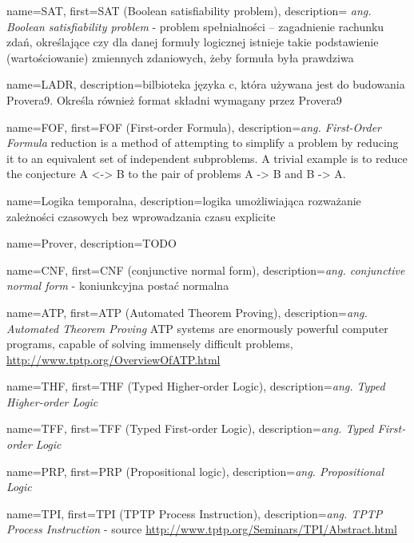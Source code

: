 
 {
    name=SAT,
    first={SAT (Boolean satisfiability problem)},
    description={ \textit{ang. Boolean satisfiability problem} - problem spełnialności – zagadnienie rachunku zdań, określające czy dla danej formuły logicznej istnieje takie podstawienie (wartościowanie) zmiennych zdaniowych, żeby formuła była prawdziwa}
}

 {
    name=LADR,
    description={bilbioteka języka c, która używana jest do budowania Provera9. Określa również format składni wymagany przez Provera9}
}

 {
    name=FOF,
    first={FOF (First-order Formula)},
    description={\textit{ang. First-Order Formula} reduction is a method of attempting to simplify a problem by reducing it to an equivalent set of independent subproblems. A trivial example is to reduce the conjecture A <-> B to the pair of problems A -> B and B -> A.}
}

 {
    name={Logika temporalna},
    description={logika umożliwiająca rozważanie zależności czasowych bez wprowadzania czasu explicite}
}

 {
    name=Prover,
    description={TODO}
}

 {
    name=CNF,
    first={CNF (conjunctive normal form)},
    description={\textit{ang. conjunctive normal form} - koniunkcyjna postać normalna}
}

 {
    name=ATP,
    first={ATP (Automated Theorem Proving)},
    description={\textit{ang. Automated Theorem Proving} ATP systems are enormously powerful computer programs, capable of solving immensely difficult problems, \url{http://www.tptp.org/OverviewOfATP.html}}
}

 {
    name=THF,
    first={THF (Typed Higher-order Logic)},
    description={\textit{ang. Typed Higher-order Logic}}
}

 {
    name=TFF,
    first={TFF (Typed First-order Logic)},
    description={\textit{ang. Typed First-order Logic}}
}

 {
    name={PRP},
    first={PRP (Propositional logic)},
    description={\textit{ang. Propositional Logic}}
}

 {
    name=TPI,
    first={TPI (TPTP Process Instruction)},
    description={\textit{ang. TPTP Process Instruction} - source \url{http://www.tptp.org/Seminars/TPI/Abstract.html}}
}


%
%

